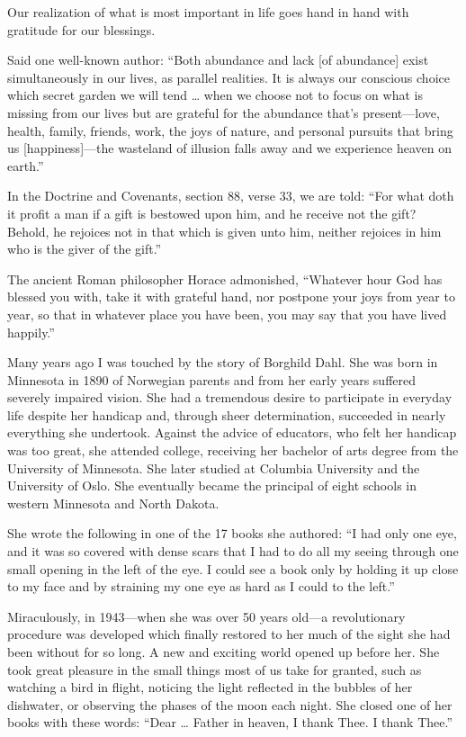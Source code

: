 \documentclass[letterpaper, 11pt]{report}
\begin{document}
Our realization of what is most important in life goes hand in hand with gratitude for our blessings.

Said one well-known author: “Both abundance and lack [of abundance] exist simultaneously in our lives, as parallel realities. It is always our conscious choice which secret garden we will tend … when we choose not to focus on what is missing from our lives but are grateful for the abundance that’s present—love, health, family, friends, work, the joys of nature, and personal pursuits that bring us [happiness]—the wasteland of illusion falls away and we experience heaven on earth.”

In the Doctrine and Covenants, section 88, verse 33, we are told: “For what doth it profit a man if a gift is bestowed upon him, and he receive not the gift? Behold, he rejoices not in that which is given unto him, neither rejoices in him who is the giver of the gift.”

The ancient Roman philosopher Horace admonished, “Whatever hour God has blessed you with, take it with grateful hand, nor postpone your joys from year to year, so that in whatever place you have been, you may say that you have lived happily.”

Many years ago I was touched by the story of Borghild Dahl. She was born in Minnesota in 1890 of Norwegian parents and from her early years suffered severely impaired vision. She had a tremendous desire to participate in everyday life despite her handicap and, through sheer determination, succeeded in nearly everything she undertook. Against the advice of educators, who felt her handicap was too great, she attended college, receiving her bachelor of arts degree from the University of Minnesota. She later studied at Columbia University and the University of Oslo. She eventually became the principal of eight schools in western Minnesota and North Dakota.

She wrote the following in one of the 17 books she authored: “I had only one eye, and it was so covered with dense scars that I had to do all my seeing through one small opening in the left of the eye. I could see a book only by holding it up close to my face and by straining my one eye as hard as I could to the left.”

Miraculously, in 1943—when she was over 50 years old—a revolutionary procedure was developed which finally restored to her much of the sight she had been without for so long. A new and exciting world opened up before her. She took great pleasure in the small things most of us take for granted, such as watching a bird in flight, noticing the light reflected in the bubbles of her dishwater, or observing the phases of the moon each night. She closed one of her books with these words: “Dear … Father in heaven, I thank Thee. I thank Thee.”
\end{document}
